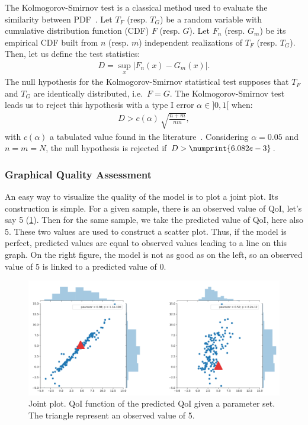 The Kolmogorov-Smirnov test is a classical method used to evaluate the similarity between PDF~\citep{clarke1992}. Let $T_F$ (resp. $T_G$) be a random variable with cumulative distribution function (CDF) $F$ (resp. $G$). Let $F_n$ (resp. $G_m$) be its empirical CDF built from $n$ (resp. $m$) independent realizations of $T_F$ (resp. $T_G$). Then, let us define the test statistics:
\begin{align}
D = \sup_{x} \lvert F_n(x) - G_m(x)\rvert.
\end{align}
The null hypothesis for the Kolmogorov-Smirnov statistical test supposes that $T_F$ and $T_G$ are identically distributed, i.e.~$F=G$. The Kolmogorov-Smirnov test leads us to reject this hypothesis with a type I error $\alpha\in]0,1[$ when:
\begin{align}
D > c(\alpha)\,\sqrt{\frac{n+m}{nm}}, \label{eq:nullhypothesis}
\end{align}
with $c(\alpha)$ a tabulated value found in the literature~\citep{smirnov1939}. Considering $\alpha = 0.05$ and $n = m = N$, the null hypothesis is rejected if $D > \numprint{6.082e-3}$.

\subsubsection{Graphical Quality Assessment}
An easy way to visualize the quality of the model is to plot a joint plot. Its construction is simple. For a given sample, there is an observed value of QoI, let's say 5 (\cref{fig:qq_plot}). Then for the same sample, we take the predicted value of QoI, here also 5. These two values are used to construct a scatter plot. Thus, if the model is perfect, predicted values are equal to observed values leading to a line on this graph. On the right figure, the model is not as good as on the left, so an observed value of 5 is linked to a predicted value of 0.

\begin{figure}[!h]
\centering
\includegraphics[width=0.9\linewidth,keepaspectratio]{fig/literature/qq_plot.png}
\caption{Joint plot. QoI function of the predicted QoI given a parameter set. The triangle represent an observed value of 5.}
\label{fig:qq_plot}
\end{figure}

